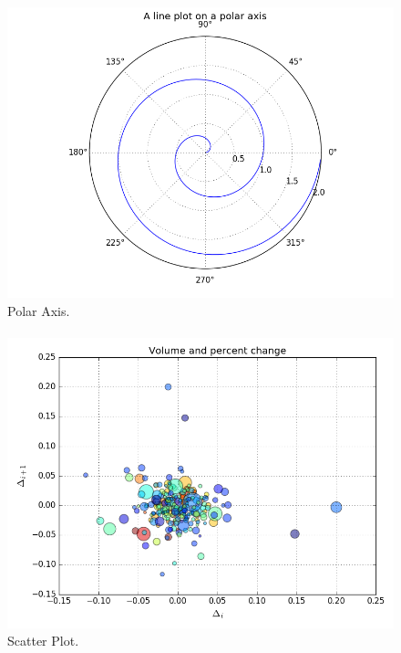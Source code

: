 \documentclass{article}
\begin{document}
        \begin{figure}[ht]
  		\centering
    		\includegraphics[scale=0.5]{./images/figure_1}
    		\caption{Polar Axis.}
		\end{figure}

        \paragraph{}
        \blindtext
        
        \begin{figure}[ht]
  		\centering
    		\includegraphics[scale=0.5]{./images/figure_2}
    		\caption{Scatter Plot.}
		\end{figure}
		
\end{document}
